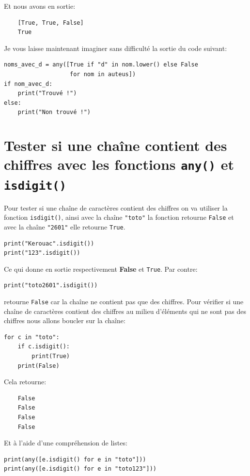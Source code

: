 \documentclass[a4paper,12pt]{book}
\begin{document}
Et nous avons en sortie:
\begin{verbatim}
    [True, True, False]
    True
\end{verbatim}
\medskip

Je vous laisse maintenant imaginer sans difficulté la sortie du code suivant:
\begin{lstlisting}
noms_avec_d = any([True if "d" in nom.lower() else False 
                   for nom in auteus])
if nom_avec_d:
    print("Trouvé !")
else:
    print("Non trouvé !")
\end{lstlisting}
\medskip

\section{Tester si une chaîne contient des chiffres avec les fonctions \texttt{any()} et \texttt{isdigit()}}
Pour tester si une chaîne de caractères contient des chiffres on va utiliser la fonction \texttt{isdigit()}, ainsi avec la chaîne \verb|"toto"| la fonction retourne \texttt{False} et avec la chaîne \verb|"2601"| elle retourne \texttt{True}.
\begin{lstlisting}
print("Kerouac".isdigit())
print("123".isdigit())
\end{lstlisting}
\medskip

Ce qui donne en sortie respectivement \textbf{False} et \texttt{True}. Par contre:
\begin{lstlisting}
print("toto2601".isdigit())
\end{lstlisting}
\medskip

retourne \texttt{False} car la chaîne ne contient pas que des chiffres. Pour vérifier si une chaîne de caractères contient des chiffres au milieu d'éléments qui ne sont pas des chiffres nous allons boucler sur la chaîne:
\begin{lstlisting}
for c in "toto":
    if c.isdigit():
        print(True)
    print(False)
\end{lstlisting}
\medskip

Cela retourne:
\begin{verbatim}
    False
    False
    False
    False
\end{verbatim}
\medskip

Et à l'aide d'une compréhension de listes:
\begin{lstlisting}
print(any([e.isdigit() for e in "toto"]))
print(any([e.isdigit() for e in "toto123"]))
\end{lstlisting}
\medskip
\end{document}
